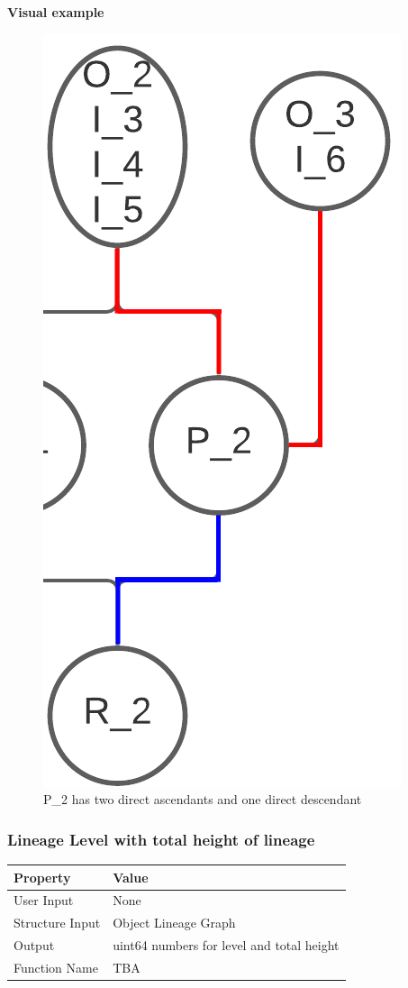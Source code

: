 \documentclass{article}
\begin{document}
\textbf{Visual example}
\begin{figure}[h]
	\centering
	\includegraphics[scale=0.2]{images/obj-dda.png}
	\caption{P\_2 has two direct ascendants and one direct descendant}
	\label{fig:obj-dda}
\end{figure}

\subsubsection{Lineage Level with total height of lineage}
\begin{center}
	\begin{tabular}{| p{3cm} p{7cm} |}
		\hline
		\textbf{Property} & \textbf{Value}\\
		\hline
		User Input & None\\
		Structure Input & Object Lineage Graph\\
		Output & uint64 numbers for level and total height\\
		Function Name & TBA\\
		\hline
	\end{tabular}
\end{center}
\end{document}
